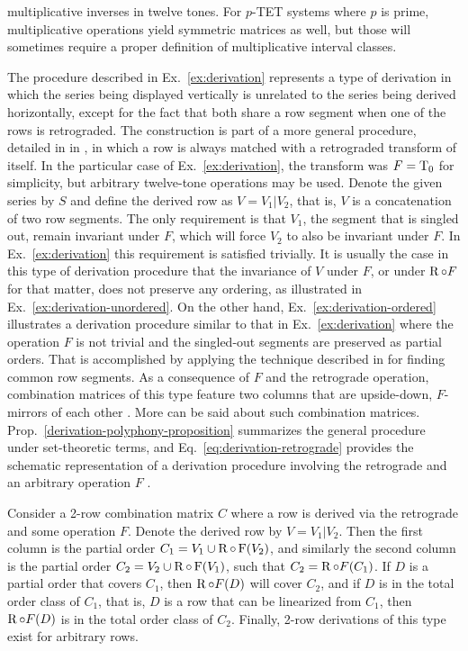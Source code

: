multiplicative inverses in twelve tones. For $p$-TET systems where $p$ is prime, multiplicative operations yield symmetric matrices as well, but those will sometimes require a proper definition of multiplicative interval classes.

The procedure described in Ex.~\ref{ex:derivation} represents a type of derivation in which the series being displayed vertically is unrelated to the series being derived horizontally, except for the fact that both share a row segment when one of the rows is retrograded. The construction is part of a more general procedure, detailed in in \cite[211]{Starr1984}, in which a row is always matched with a retrograded transform of itself. In the particular case of Ex.~\ref{ex:derivation}, the transform was $F = \operatorname{T}_0$ for simplicity, but arbitrary twelve-tone operations may be used. Denote the given series by $S$ and define the derived row as $V = V_1 | V_2$, that is, $V$ is a concatenation of two row segments. The only requirement is that $V_1$, the segment that is singled out, remain invariant under $F$, which will force $V_2$ to also be invariant under $F$. In Ex.~\ref{ex:derivation} this requirement is satisfied trivially. It is usually the case in this type of derivation procedure that the invariance of $V$ under $F$, or under $\operatorname{R} \circ F$ for that matter, does not preserve any ordering, as illustrated in Ex.~\ref{ex:derivation-unordered}. On the other hand, Ex.~\ref{ex:derivation-ordered} illustrates a derivation procedure similar to that in Ex.~\ref{ex:derivation} where the operation $F$ is not trivial and the singled-out segments are preserved as partial orders. That is accomplished by applying the technique described in \cite[49]{Morris1987} for finding common row segments. As a consequence of $F$ and the retrograde operation, combination matrices of this type feature two columns that are upside-down, $F$-mirrors of each other \cite[211]{Starr1984}. More can be said about such combination matrices. Prop.~\ref{derivation-polyphony-proposition} summarizes the general procedure under set-theoretic terms, and Eq.~\ref{eq:derivation-retrograde} provides the schematic representation of a derivation procedure involving the retrograde and an arbitrary operation $F$ \cite[212]{Starr1984}.

\begin{proposition}
	\label{derivation-polyphony-proposition}
    \cite[211, 214]{Starr1984}
    Consider a 2-row combination matrix $C$ where a row is derived via the retrograde and some operation $F$. Denote the derived row by $V = V_1 | V_2$. Then the first column is the partial order $C_1 = V_1 \cup \operatorname{R} \circ \operatorname{F}(V_2)$, and similarly the second column is the partial order $C_2 = V_2 \cup \operatorname{R} \circ \operatorname{F}(V_1)$, such that $C_2 = \operatorname{R} \circ F(C_1)$. If $D$ is a partial order that covers $C_1$, then $\operatorname{R} \circ F(D)$ will cover $C_2$, and if $D$ is in the total order class of $C_1$, that is, $D$ is a row that can be linearized from $C_1$, then $\operatorname{R} \circ F(D)$ is in the total order class of $C_2$. Finally, 2-row derivations of this type exist for arbitrary rows.
\end{proposition}

